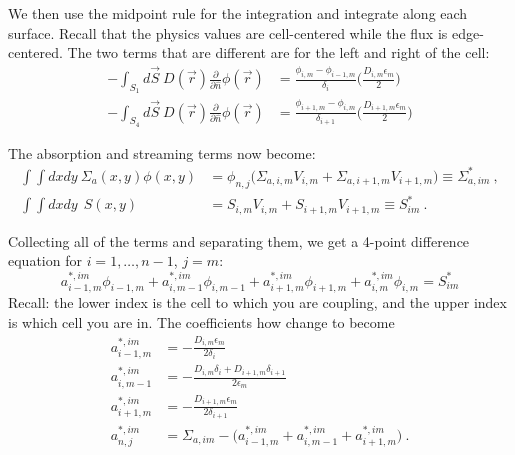 \documentclass[12pt]{article}
\begin{document}
We then use the midpoint rule for the integration and integrate along each surface. Recall that the physics values are cell-centered while the flux is edge-centered. The two terms that are different are for the left and right of the cell:
%
\begin{align}
- \int_{S_1} d\vec{S} \:D(\vec{r})\frac{\partial}{\partial \hat{n}}\phi(\vec{r}) &= \frac{\phi_{i,m} - \phi_{i-1,m}}{\delta_{i}} \biggl(\frac{D_{i,m} \epsilon_{m}}{2}\biggr) \nonumber \\ 
%
- \int_{S_4} d\vec{S} \:D(\vec{r})\frac{\partial}{\partial \hat{n}}\phi(\vec{r}) &= \frac{\phi_{i+1,m} - \phi_{i,m}}{\delta_{i+1}} \biggl(\frac{D_{i+1,m} \epsilon_{m}}{2}\biggr) \nonumber
\end{align}

The absorption and streaming terms now become:
\begin{align}
\int \int dx dy\:\Sigma_a(x,y) \phi(x,y) &= \boxed{\phi_{n,j}\bigl(\Sigma_{a,i,m} V_{i,m} + \Sigma_{a,i+1,m} V_{i+1,m} \bigr)  \equiv \Sigma^*_{a,im}}\:, \nonumber \\
%
\int \int dx dy \: \:S(x,y) &= \boxed{S_{i,m} V_{i,m} + S_{i+1,m} V_{i+1,m} \equiv S^*_{im}}\:. \nonumber
\end{align}

\vspace*{2em}
Collecting all of the terms and separating them, we get a 4-point difference equation for $i=1,\dots,n-1$, $j=m$:
%
\[\boxed{a_{i-1,m}^{*,im}\phi_{i-1,m} + a_{i,m-1}^{*,im}\phi_{i,m-1} + a_{i+1,m}^{*,im}\phi_{i+1,m} +  a_{i,m}^{*,im}\phi_{i,m} = S^*_{im}} \]
%
Recall: the lower index is the cell to which you are coupling, and the upper index is which cell you are in. The coefficients how change to become
%
\begin{align}
a_{i-1,m}^{*,im} &= -\frac{D_{i,m} \epsilon_{m}}{2\delta_{i}}  \nonumber \\
%
a_{i,m-1}^{*,im} &= -\frac{D_{i,m} \delta_{i} + D_{i+1,m} \delta_{i+1}}{2 \epsilon_{m}}  \nonumber \\
%
a_{i+1,m}^{*,im} &= -\frac{D_{i+1,m} \epsilon_{m}}{2\delta_{i+1}} \nonumber \\
%
a_{n,j}^{*,im} &= \Sigma_{a,im} - \bigl(a_{i-1,m}^{*,im} + a_{i,m-1}^{*,im} + a_{i+1,m}^{*,im} \bigr)
 \:.\nonumber
\end{align}
\end{document}

